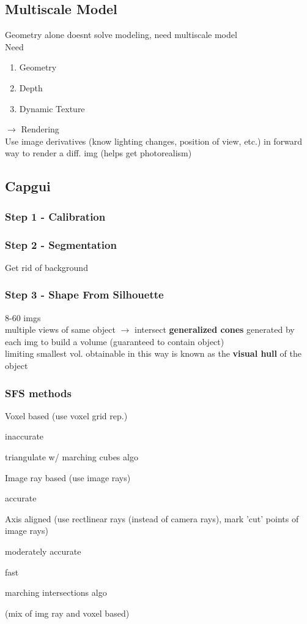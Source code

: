 \documentclass{article}
\begin{document}
\subsection{Multiscale Model}
Geometry alone doesnt solve modeling, need multiscale model
\\
Need
\begin{enumerate}
  \item Geometry
  \item Depth
  \item Dynamic Texture
\end{enumerate}
$\to$ Rendering
\\
Use image derivatives (know lighting changes, position of view, etc.) in forward way to render a diff. img (helps get photorealism)


\subsection{Capgui}
\subsubsection*{Step 1 - Calibration}
\subsubsection*{Step 2 - Segmentation}
Get rid of background
\subsubsection*{Step 3 - Shape From Silhouette}
8-60 imgs
\\
multiple views of same object $\to$ intersect \textbf{generalized cones} generated by each img
to build a volume (guaranteed to contain object)
\\
limiting smallest vol. obtainable in this way is known as the \textbf{visual hull} of the object


\subsubsection{SFS methods}
Voxel based (use voxel grid rep.)
\begin{list}{}{}
  \item inaccurate
  \item triangulate w/ marching cubes algo
\end{list}
Image ray based (use image rays)
\begin{list}{}{}
  \item accurate
\end{list}
Axis aligned (use rectlinear rays (instead of camera rays), mark 'cut' points of 
image rays)
\begin{list}{}{}
  \item moderately accurate
  \item fast
  \item marching intersections algo
  \item (mix of img ray and voxel based)
\end{list}
\end{document}
